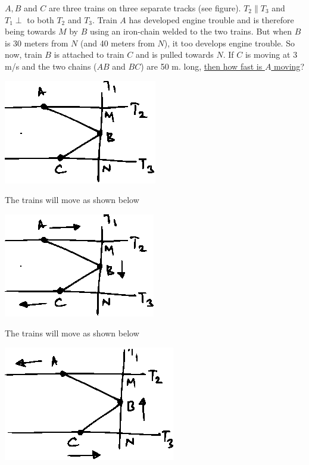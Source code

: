 \documentclass[14pt,fleqn]{extarticle}
\begin{document}
\begin{problem}
\statement
	

    $A, B$ and $C$ are three trains on three separate
    tracks (see figure). $T_2\parallel T_3$ and  $T_1\perp$ to both
    $T_2$ and $T_3$. Train $A$ has developed engine trouble 
    and is therefore being towards $M$ by $B$ using
    an iron-chain welded to the two trains. But 
    when $B$ is 30 meters from $N$ (and 40 meters 
    from $N$), it too develops engine trouble. So
    now, train $B$ is attached to train $C$ and is pulled
    towards $N$. If $C$ is moving at 3 m/s and the two
    chains ($AB$ and $BC$) are 50 m. long, 
    \underline{then how fast is $A$ moving}?
    
    \begin{center}
\includegraphics[scale=1.8]{333-A.eps}
\end{center}
    
\begin{step}
	\begin{options}
	
	\correct 
	
	The trains will move as shown below 
	\begin{center}
\includegraphics[scale=1.5]{333-B.eps}
\end{center}

	\incorrect 
	
	The trains will move as shown below 
	\begin{center}
\includegraphics[scale=1.5]{333-C.eps}
\end{center}
	

\end{options}
\end{step}
\end{problem}
\end{document}

